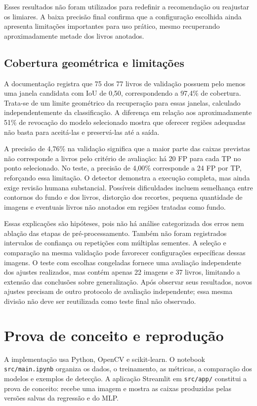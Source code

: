 \documentclass[12pt,a4paper,twocolumn]{article}
\begin{document}
Esses resultados não foram utilizados para redefinir a recomendação ou reajustar os limiares. A baixa precisão final confirma que a configuração escolhida ainda apresenta limitações importantes para uso prático, mesmo recuperando aproximadamente metade dos livros anotados.

\subsection{Cobertura geométrica e limitações}
A documentação registra que 75 dos 77 livros de validação possuem pelo menos uma janela candidata com IoU de 0,50, correspondendo a 97,4\% de cobertura. Trata-se de um limite geométrico da recuperação para essas janelas, calculado independentemente da classificação. A diferença em relação aos aproximadamente 51\% de revocação do modelo selecionado mostra que oferecer regiões adequadas não basta para aceitá-las e preservá-las até a saída.

A precisão de 4,76\% na validação significa que a maior parte das caixas previstas não corresponde a livros pelo critério de avaliação: há 20 FP para cada TP no ponto selecionado. No teste, a precisão de 4,00\% corresponde a 24 FP por TP, reforçando essa limitação. O detector demonstra a execução completa, mas ainda exige revisão humana substancial. Possíveis dificuldades incluem semelhança entre contornos do fundo e dos livros, distorção dos recortes, pequena quantidade de imagens e eventuais livros não anotados em regiões tratadas como fundo.

Essas explicações são hipóteses, pois não há análise categorizada dos erros nem ablação das etapas de pré-processamento. Também não foram registrados intervalos de confiança ou repetições com múltiplas sementes. A seleção e comparação na mesma validação pode favorecer configurações específicas dessas imagens. O teste com escolhas congeladas fornece uma avaliação independente dos ajustes realizados, mas contém apenas 22 imagens e 37 livros, limitando a extensão das conclusões sobre generalização. Após observar seus resultados, novos ajustes precisam de outro protocolo de avaliação independente; essa mesma divisão não deve ser reutilizada como teste final não observado.

\section{Prova de conceito e reprodução}
A implementação usa Python, OpenCV e scikit-learn. O notebook \texttt{src/main.ipynb} organiza os dados, o treinamento, as métricas, a comparação dos modelos e exemplos de detecção. A aplicação Streamlit em \texttt{src/app/} constitui a prova de conceito: recebe uma imagem e mostra as caixas produzidas pelas versões salvas da regressão e do MLP.
\end{document}
